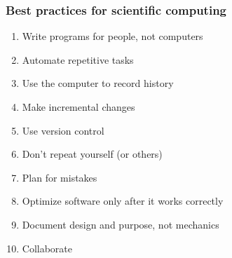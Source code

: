 \documentclass[slidestop]{beamer}
\begin{document}
{
  \frame{}
}

\begin{frame}
  \frametitle{Best practices for scientific computing}
  \begin{enumerate}
    \item Write programs for people, not computers
    \item Automate repetitive tasks
    \item Use the computer to record history
    \item Make incremental changes
    \item Use version control
    \item Don't repeat yourself (or others)
    \item Plan for mistakes
    \item Optimize software only after it works correctly
    \item Document design and purpose, not mechanics
    \item Collaborate
  \end{enumerate}
\end{frame}
\end{document}
